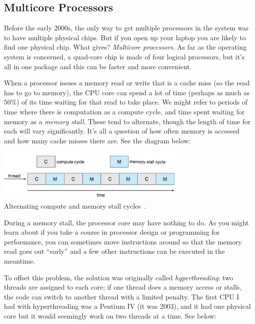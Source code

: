 \subsection*{Multicore Processors}
Before the early 2000s, the only way to get multiple processors in the system was to have multiple physical chips. But if you open up your laptop you are likely to find one physical chip. What gives? \textit{Multicore processors}. As far as the operating system is concerned, a quad-core chip is made of four logical processors, but it's all in one package and this can be faster and more convenient.

When a processor issues a memory read or write that is a cache miss (so the read has to go to memory), the CPU core can spend a lot of time (perhaps as much as 50\%) of its time waiting for that read to take place. We might refer to periods of time where there is computation as a compute cycle, and time spent waiting for memory as a \textit{memory stall}. These tend to alternate, though the length of time for each will vary significantly. It's all a question of how often memory is accessed and how many cache misses there are. See the diagram below:

\begin{center}
	\includegraphics[width=0.7\textwidth]{images/memory-stall.png}\\
	Alternating compute and memory stall cycles~\cite{osc}.
\end{center}

During a memory stall, the processor core may have nothing to do. As you might learn about if you take a course in processor design or programming for performance, you can sometimes move instructions around so that the memory read goes out ``early'' and a few other instructions can be executed in the meantime. 

To offset this problem, the solution was originally called \textit{hyperthreading}: two threads are assigned to each core; if one thread does a memory access or stalls, the code can switch to another thread with a limited penalty. The first CPU I had with hyperthreading was a Pentium IV (it was 2003), and it had one physical core but it would seemingly work on two threads at a time. See below:

